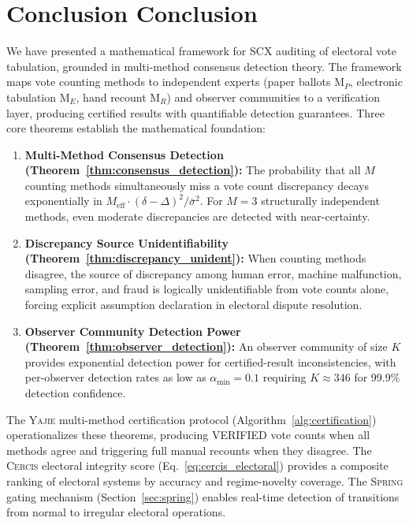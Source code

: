 \documentclass[11pt,a4paper]{article}
\theoremstyle{definition}
\newcommand{\Yajie}{\textsc{Yajie}}
\newcommand{\Spring}{\textsc{Spring}}
\newcommand{\Cercis}{\textsc{Cercis}}
\newcommand{\SCX}{\textsc{SCX}}
\newcommand{\method}[1]{\mathrm{M}_{#1}}
\begin{document}
\section{Conclusion Conclusion}
\label{sec:conclusion}
We have presented a mathematical framework for \SCX{} auditing of electoral vote tabulation, grounded in multi-method consensus detection theory. The framework maps vote counting methods to independent experts (paper ballots $\method{P}$, electronic tabulation $\method{E}$, hand recount $\method{R}$) and observer communities to a verification layer, producing certified results with quantifiable detection guarantees.
Three core theorems establish the mathematical foundation:
\begin{enumerate}[label=(\textbf{T\arabic*}), leftmargin=*]
    \item \textbf{Multi-Method Consensus Detection (Theorem~\ref{thm:consensus_detection}):} The probability that all $M$ counting methods simultaneously miss a vote count discrepancy decays exponentially in $M_{\text{eff}} \cdot (\delta - \Delta)^2 / \bar{\sigma}^2$. For $M = 3$ structurally independent methods, even moderate discrepancies are detected with near-certainty.
    \item \textbf{Discrepancy Source Unidentifiability (Theorem~\ref{thm:discrepancy_unident}):} When counting methods disagree, the source of discrepancy among human error, machine malfunction, sampling error, and fraud is logically unidentifiable from vote counts alone, forcing explicit assumption declaration in electoral dispute resolution.
    \item \textbf{Observer Community Detection Power (Theorem~\ref{thm:observer_detection}):} An observer community of size $K$ provides exponential detection power for certified-result inconsistencies, with per-observer detection rates as low as $\alpha_{\min} = 0.1$ requiring $K \approx 346$ for 99.9\% detection confidence.
\end{enumerate}
The \Yajie{} multi-method certification protocol (Algorithm~\ref{alg:certification}) operationalizes these theorems, producing VERIFIED vote counts when all methods agree and triggering full manual recounts when they disagree. The \Cercis{} electoral integrity score (Eq.~\eqref{eq:cercis_electoral}) provides a composite ranking of electoral systems by accuracy and regime-novelty coverage. The \Spring{} gating mechanism (Section~\ref{sec:spring}) enables real-time detection of transitions from normal to irregular electoral operations.
\end{document}
